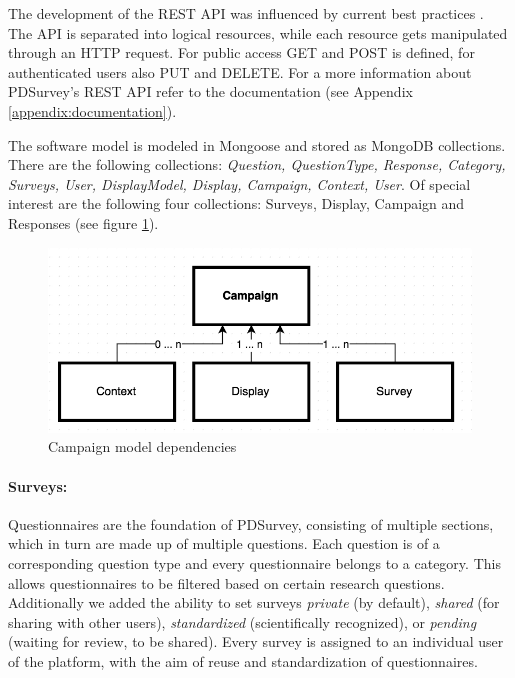 	The development of the REST API was influenced by current best practices \cite{Sahni2015RESTAPI, TutsPlus2015RESTAPI, hughes2012einfuhrung}. The API is separated into logical resources, while each resource gets manipulated through an HTTP request. For public access GET and POST is defined, for authenticated users also PUT and DELETE. For a more information about PDSurvey's REST API refer to the documentation (see Appendix \ref{appendix:documentation}).

	The software model is modeled in Mongoose and stored as MongoDB collections. There are the following collections: \textit{Question, QuestionType, Response, Category, Surveys, User, DisplayModel, Display, Campaign, Context, User}. 
	Of special interest are the following four collections: Surveys, Display, Campaign and Responses (see figure \ref{fig:4-dependency-campaign}).

\begin{figure}%
    \begin{center}
        \includegraphics[width=.8\columnwidth]{img/4_implementation/4-dependency-campaign}
    \end{center}
 \caption{Campaign model dependencies}
 \label{fig:4-dependency-campaign}
\end{figure}


	\paragraph{Surveys:} Questionnaires are the foundation of PDSurvey, consisting of multiple sections, which in turn are made up of multiple questions. Each question is of a corresponding question type and every questionnaire belongs to a category. This allows questionnaires to be filtered based on certain research questions. Additionally we added the ability to set surveys \textit{private} (by default), \textit{shared} (for sharing with other users), \textit{standardized} (scientifically recognized), or \textit{pending} (waiting for review, to be shared). Every survey is assigned to an individual user of the platform, with the aim of reuse and standardization of questionnaires.

